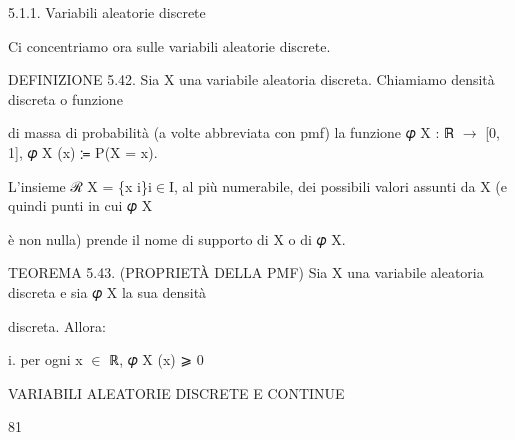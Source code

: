 \documentclass[a4paper,portrait,12pt]{article}
\begin{document}
\begin{flushleft}
5.1.1. Variabili aleatorie discrete
\end{flushleft}


\begin{flushleft}
Ci concentriamo ora sulle variabili aleatorie discrete.
\end{flushleft}





\begin{flushleft}
DEFINIZIONE 5.42. Sia X una variabile aleatoria discreta. Chiamiamo densit\`{a} discreta o funzione
\end{flushleft}


\begin{flushleft}
di massa di probabilit\`{a} (a volte abbreviata con pmf) la funzione 𝜑 X : ℝ $\rightarrow$ [0, 1], 𝜑 X (x) ≔ P(X = x).
\end{flushleft}


\begin{flushleft}
L'insieme ℛ X = \{x i\}i$\in$I, al più numerabile, dei possibili valori assunti da X (e quindi punti in cui 𝜑 X
\end{flushleft}


\begin{flushleft}
\`{e} non nulla) prende il nome di supporto di X o di 𝜑 X.
\end{flushleft}


\begin{flushleft}
TEOREMA 5.43. (PROPRIET\`{A} DELLA PMF) Sia X una variabile aleatoria discreta e sia 𝜑 X la sua densit\`{a}
\end{flushleft}


\begin{flushleft}
discreta. Allora:
\end{flushleft}


\begin{flushleft}
i. per ogni x $\in$ ℝ, 𝜑 X (x) ⩾ 0
\end{flushleft}





\begin{flushleft}
 VARIABILI ALEATORIE DISCRETE E CONTINUE
\end{flushleft}





81
\end{document}
